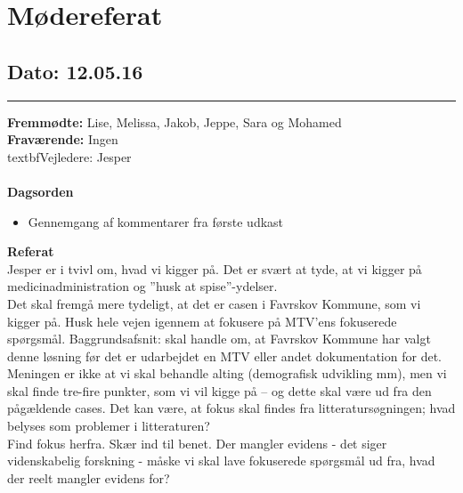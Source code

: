 \chapter{Mødereferat}

\section{Dato: 12.05.16}
\hrule

\textbf{Fremmødte:} Lise, Melissa, Jakob, Jeppe, Sara og Mohamed \\
\textbf{Fraværende:} Ingen
\\textbf{Vejledere:} Jesper
\\
\\
\textbf{Dagsorden}
\begin{itemize}
	\item Gennemgang af kommentarer fra første udkast \\ 
\end{itemize}


\textbf{Referat} 
\\
Jesper er i tvivl om, hvad vi kigger på. Det er svært at tyde, at vi kigger på medicinadministration og ”husk at spise”-ydelser. \\
Det skal fremgå mere tydeligt, at det er casen i Favrskov Kommune, som vi kigger på. Husk hele vejen igennem at fokusere på MTV’ens fokuserede spørgsmål. 
Baggrundsafsnit: skal handle om, at Favrskov Kommune har valgt denne løsning før det er udarbejdet en MTV eller andet dokumentation for det. Meningen er ikke at vi skal behandle alting (demografisk udvikling mm), men vi skal finde tre-fire punkter, som vi vil kigge på – og dette skal være ud fra den pågældende cases. Det kan være, at fokus skal findes fra litteratursøgningen; hvad belyses som problemer i litteraturen? \\ Find fokus herfra. 
Skær ind til benet. 
Der mangler evidens - det siger videnskabelig forskning - måske vi skal lave fokuserede spørgsmål ud fra, hvad der reelt mangler evidens for? \\


